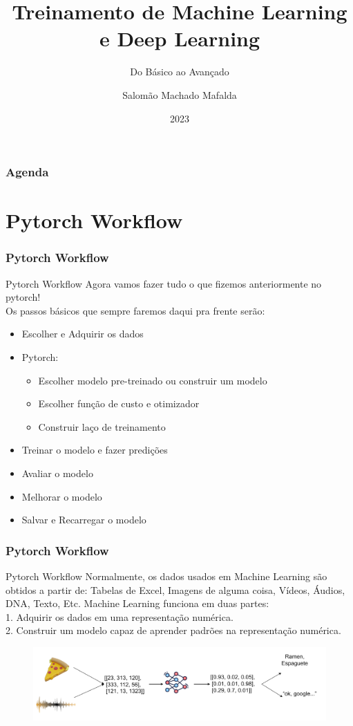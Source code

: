 \documentclass{beamer}
\title[Machine Learning]
{Treinamento de Machine Learning e Deep Learning}
\subtitle{Do Básico ao Avançado}
\author[Mafalda, Salomão] %
{Salomão Machado Mafalda\inst{1}}
\institute[PAVIC] %
{
  \inst{1}%
  Universidade Federal do Acre\\
  PAVIC

}
\date[2023] %
{2023}
\begin{document}
\frame{\titlepage}

\begin{frame}
\frametitle{Agenda}
\tableofcontents
\end{frame}



\section{Pytorch Workflow}

\begin{frame}
	\frametitle{Pytorch Workflow}
	\begin{block}{Pytorch Workflow}
		Agora vamos fazer tudo o que fizemos anteriormente no pytorch! \\
		Os passos básicos que sempre faremos daqui pra frente serão: 
		\begin{itemize}
			\item Escolher e Adquirir os dados
			\item Pytorch:
			\begin{itemize}
				\item Escolher modelo pre-treinado ou construir um modelo
				\item Escolher função de custo e otimizador
				\item Construir laço de treinamento
			\end{itemize}
			\item Treinar o modelo e fazer predições
			\item Avaliar o modelo
			\item Melhorar o modelo
			\item Salvar e Recarregar o modelo
		\end{itemize}
	\end{block}
\end{frame}
\begin{frame}
	\frametitle{Pytorch Workflow}
	\begin{block}{Pytorch Workflow}
		Normalmente, os dados usados em Machine Learning são obtidos a partir de: Tabelas de Excel, Imagens de alguma coisa, Vídeos, Áudios, DNA, Texto, Etc.
	Machine Learning funciona em duas partes: \\
	1. Adquirir os dados em uma representação numérica. \\
	2. Construir um modelo capaz de aprender padrões na representação numérica.
	\begin{figure}
		\centering
		\includegraphics[width=1\linewidth]{figures/workflow_nn}
	\end{figure}
	
	\end{block}
\end{frame}
\end{document}
